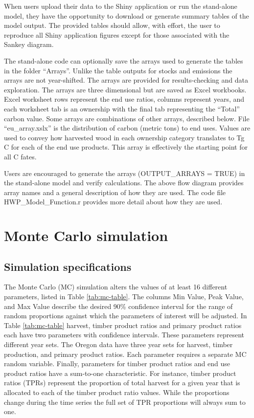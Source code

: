 \documentclass[
]{book}
\begin{document}
When users upload their data to the Shiny application or run the stand-alone model, they have the opportunity to download or generate summary tables of the model output. The provided tables should allow, with effort, the user to reproduce all Shiny application figures except for those associated with the Sankey diagram.

The stand-alone code can optionally save the arrays used to generate the tables in the folder ``Arrays''. Unlike the table outputs for stocks and emissions the arrays are not year-shifted. The arrays are provided for results-checking and data exploration. The arrays are three dimensional but are saved as Excel workbooks. Excel worksheet rows represent the end use ratios, columns represent years, and each worksheet tab is an ownership with the final tab representing the ``Total'' carbon value. Some arrays are combinations of other arrays, described below. File ``eu\_array.xslx'' is the distribution of carbon (metric tons) to end uses. Values are used to convey how harvested wood in each ownership category translates to Tg C for each of the end use products. This array is effectively the starting point for all C fates.

Users are encouraged to generate the arrays (OUTPUT\_ARRAYS = TRUE) in the stand-alone model and verify calculations. The above flow diagram provides array names and a general description of how they are used. The code file HWP\_Model\_Function.r provides more detail about how they are used.

\hypertarget{model-mc}{%
\section{Monte Carlo simulation}\label{model-mc}}

\hypertarget{model-mc-spec}{%
\subsection{Simulation specifications}\label{model-mc-spec}}

The Monte Carlo (MC) simulation alters the values of at least 16 different parameters, listed in Table \ref{tab:mc-table}. The columns Min Value, Peak Value, and Max Value describe the desired 90\% confidence interval for the range of random proportions against which the parameters of interest will be adjusted. In Table \ref{tab:mc-table} harvest, timber product ratios and primary product ratios each have two parameters with confidence intervals. These parameters represent different year sets. The Oregon data have three year sets for harvest, timber production, and primary product ratios. Each parameter requires a separate MC random variable. Finally, parameters for timber product ratios and end use product ratios have a sum-to-one characteristic. For instance, timber product ratios (TPRs) represent the proportion of total harvest for a given year that is allocated to each of the timber product ratio values. While the proportions change during the time series the full set of TPR proportions will always sum to one.
\end{document}
